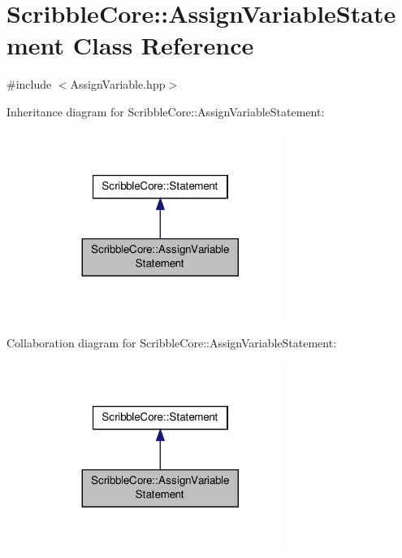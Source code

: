 \hypertarget{class_scribble_core_1_1_assign_variable_statement}{\section{Scribble\-Core\-:\-:Assign\-Variable\-Statement Class Reference}
\label{class_scribble_core_1_1_assign_variable_statement}
}


{\ttfamily \#include $<$Assign\-Variable.\-hpp$>$}



Inheritance diagram for Scribble\-Core\-:\-:Assign\-Variable\-Statement\-:\nopagebreak
\begin{figure}[H]
\begin{center}
\leavevmode
\includegraphics[width=224pt]{class_scribble_core_1_1_assign_variable_statement__inherit__graph}
\end{center}
\end{figure}


Collaboration diagram for Scribble\-Core\-:\-:Assign\-Variable\-Statement\-:\nopagebreak
\begin{figure}[H]
\begin{center}
\leavevmode
\includegraphics[width=224pt]{class_scribble_core_1_1_assign_variable_statement__coll__graph}
\end{center}
\end{figure}
